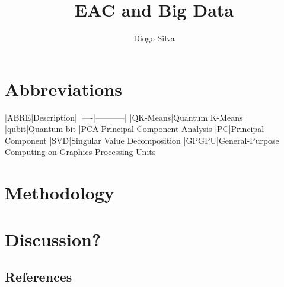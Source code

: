 \documentclass[10pt,a4paper,final]{article}
\author{Diogo Silva}
\title{EAC and Big Data}
\begin{document}
\onehalfspacing %

\section{Abbreviations}

|ABRE|Description|
|----|-----------|
|QK-Means|Quantum K-Means
|qubit|Quantum bit
|PCA|Principal Component Analysis
|PC|Principal Component
|SVD|Singular Value Decomposition
|GPGPU|General-Purpose Computing on Graphics Processing Units



\tableofcontents









\section{Methodology}




\section{Discussion?}

\subsection{References}



\end{document}
